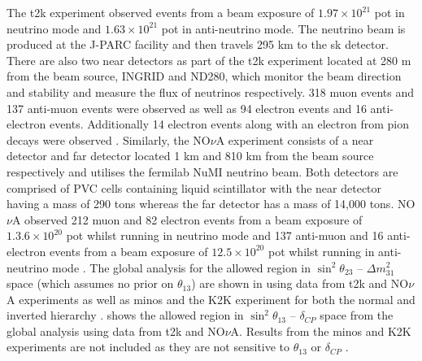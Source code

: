 The \gls{t2k} experiment observed events from a beam exposure of $1.97 \times 10^{21}$ \gls{pot} in neutrino mode and $1.63 \times 10^{21}$ \gls{pot} in anti-neutrino mode. The neutrino beam is produced at the J-PARC facility and then travels 295 km to the \gls{sk} detector. There are also two near detectors as part of the \gls{t2k} experiment located at 280 m from the beam source, INGRID and ND280, which monitor the beam direction and stability and measure the flux of neutrinos respectively. 318 muon events and 137 anti-muon events were observed as well as 94 electron events and 16 anti-electron events. Additionally 14 electron events along with an electron from pion decays were observed \cite{T2K_2020}. Similarly, the NO$\nu$A experiment consists of a near detector and far detector located 1 km and 810 km from the beam source respectively and utilises the \gls{fermilab} NuMI neutrino beam. Both detectors are comprised of PVC cells containing liquid scintillator with the near detector having a mass of 290 tons whereas the far detector has a mass of 14,000 tons. NO$\nu$A observed 212 muon and 82 electron events from a beam exposure of $1.3.6 \times 10^{20}$ \gls{pot} whilst running in neutrino mode and 137 anti-muon and 16 anti-electron events from a beam exposure of $12.5 \times 10^{20}$ \gls{pot} whilst running in anti-neutrino mode \cite{New_constraints_on_oscillation_parameters_from_nue_and_numu_disappearance_in_the_NOvA_experiment}\cite{First_measurement_of_neutrino_oscillation_parameters_using_neutrinos_and_antineutrinos_by_NOvA}. The global analysis for the allowed region in $\sin^2{\theta_{23}}$ -- $\Delta m^2_{31}$ space (which assumes no prior on $\theta_{13}$) are shown in  using data from \gls{t2k} and NO$\nu$A experiments as well as \gls{minos} and the K2K experiment for both the normal and inverted hierarchy  \cite{Measurement_of_Neutrino_and_Antineutrino_Oscillations_Using_Beam_and_Atmospheric_Data_in_MINOS}\cite{Electron_Neutrino_and_Antineutrino_Appearance_in_the_Full_MINOS_Data_Sample}\cite{K2K_experiment}.  shows the allowed region in $\sin^2{\theta_{13}}$ -- $\delta_{CP}$ space from the global analysis using data from \gls{t2k} and NO$\nu$A. Results from the \gls{minos} and K2K experiments are not included as they are not sensitive to $\theta_{13}$ or $\delta_{CP}$ \cite{2020_global_reassessment_of_the_neutrino_oscillation_picture}. 

